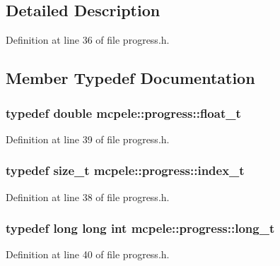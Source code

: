 \subsection{\-Detailed \-Description}


\-Definition at line 36 of file progress.\-h.



\subsection{\-Member \-Typedef \-Documentation}
\hypertarget{classmcpele_1_1progress_a58b0ad8ca4041095da304be26345e533}{
\subsubsection[{float\-\_\-t}]{\setlength{\rightskip}{0pt plus 5cm}typedef double {\bf mcpele\-::progress\-::float\-\_\-t}}}\label{classmcpele_1_1progress_a58b0ad8ca4041095da304be26345e533}


\-Definition at line 39 of file progress.\-h.

\hypertarget{classmcpele_1_1progress_a3af9df6e1a8f337ef00e368820377316}{
\subsubsection[{index\-\_\-t}]{\setlength{\rightskip}{0pt plus 5cm}typedef size\-\_\-t {\bf mcpele\-::progress\-::index\-\_\-t}}}\label{classmcpele_1_1progress_a3af9df6e1a8f337ef00e368820377316}


\-Definition at line 38 of file progress.\-h.

\hypertarget{classmcpele_1_1progress_aca882b448ea2df62757b62ccdcf72064}{
\subsubsection[{long\-\_\-t}]{\setlength{\rightskip}{0pt plus 5cm}typedef long long int {\bf mcpele\-::progress\-::long\-\_\-t}}}\label{classmcpele_1_1progress_aca882b448ea2df62757b62ccdcf72064}


\-Definition at line 40 of file progress.\-h.



